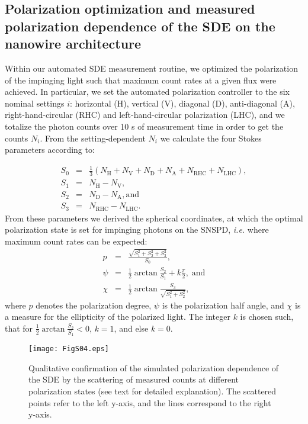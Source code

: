 \documentclass[aip,apl,showpacs,showkeys,preprint,superscriptaddress,preprintnumbers,amsmath,amssymb]{revtex4-1}
\begin{document}
\begin{bibunit}
\subsection{Polarization optimization and measured polarization dependence of the SDE on the nanowire architecture}

Within our automated SDE measurement routine, we optimized the polarization of the impinging light such that maximum count rates at a given flux were achieved. In particular, we set the automated polarization controller to the six nominal settings $i$: horizontal (H), vertical (V), diagonal (D), anti-diagonal (A), right-hand-circular (RHC) and left-hand-circular polarization (LHC), and we totalize the photon counts over 10 s of measurement time in order to get the counts $N_i$. From the setting-dependent $N_i$ we calculate the four Stokes parameters according to:

\begin{equation*}
\begin{array}{rcl}
S_0&=&\frac{1}{3}\left(N_\mathrm{H}+N_\mathrm{V}+N_\mathrm{D}+N_\mathrm{A}+N_\mathrm{RHC}+N_\mathrm{LHC}\right),\\
S_1&=&N_\mathrm{H}-N_\mathrm{V},\\
S_2&=&N_\mathrm{D}-N_\mathrm{A},\mathrm{and}\\
S_3&=&N_\mathrm{RHC}-N_\mathrm{LHC}.
\end{array}
\end{equation*}
From these parameters we derived the spherical coordinates, at which the optimal polarization state is set for impinging photons on the SNSPD, \textit{i.e.} where maximum count rates can be expected:
\begin{equation*}
\begin{array}{rcl}
p&=&\frac{\sqrt{S_1^2+S_2^2+S_3^2}}{S_0},\\
\psi&=&\frac{1}{2}\arctan \frac{S_2}{S_1}+k\frac{\pi}{2},\;\mathrm{and}\\
\chi&=&\frac{1}{2}\arctan \frac{S_3}{\sqrt{S_1^2+S_2^2}},
\end{array}
\end{equation*}
where $p$ denotes the polarization degree, $\psi$ is the polarization half angle, and $\chi$ is a measure for the ellipticity of the polarized light. The integer $k$ is chosen such, that for $\frac{1}{2}\arctan \frac{S_2}{S_1}<0$, $k=1$, and else $k=0$.

\begin{figure}
\texttt{[image: FigS04.eps]}
\caption{\label{fig:s04} Qualitative confirmation of the simulated polarization dependence of the SDE by the scattering of measured counts at different polarization states (see text for detailed explanation). The scattered points refer to the left y-axis, and the lines correspond to the right y-axis.}
\end{figure}


\end{bibunit}
\end{document}
